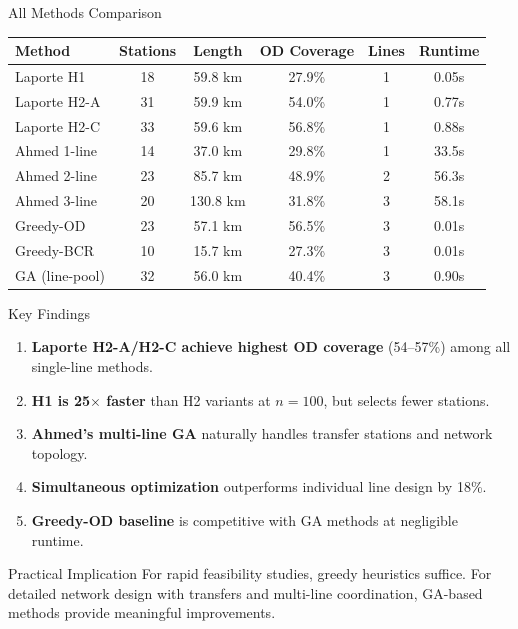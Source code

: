 \documentclass[aspectratio=169, 11pt]{beamer}
\begin{document}
\begin{frame}{All Methods Comparison}

\centering
\small
\begin{tabular}{lccccc}
\toprule
\textbf{Method} & \textbf{Stations} & \textbf{Length} & \textbf{OD Coverage} & \textbf{Lines} & \textbf{Runtime} \\
\midrule
Laporte H1    & 18 & 59.8 km & 27.9\% & 1 & 0.05s \\
Laporte H2-A  & 31 & 59.9 km & 54.0\% & 1 & 0.77s \\
Laporte H2-C  & 33 & 59.6 km & 56.8\% & 1 & 0.88s \\
\midrule
Ahmed 1-line  & 14 & 37.0 km & 29.8\% & 1 & 33.5s \\
Ahmed 2-line  & 23 & 85.7 km & 48.9\% & 2 & 56.3s \\
Ahmed 3-line  & 20 & 130.8 km & 31.8\% & 3 & 58.1s \\
\midrule
Greedy-OD     & 23 & 57.1 km & 56.5\% & 3 & 0.01s \\
Greedy-BCR    & 10 & 15.7 km & 27.3\% & 3 & 0.01s \\
GA (line-pool) & 32 & 56.0 km & 40.4\% & 3 & 0.90s \\
\bottomrule
\end{tabular}
\end{frame}

\begin{frame}{Key Findings}

\begin{enumerate}
    \item \textbf{Laporte H2-A/H2-C achieve highest OD coverage} (54--57\%) among all single-line methods.
    \item \textbf{H1 is 25\(\times\) faster} than H2 variants at \(n=100\), but selects fewer stations.
    \item \textbf{Ahmed's multi-line GA} naturally handles transfer stations and network topology.
    \item \textbf{Simultaneous optimization} outperforms individual line design by 18\%.
    \item \textbf{Greedy-OD baseline} is competitive with GA methods at negligible runtime.
\end{enumerate}

\vspace{0.3cm}
\begin{block}{Practical Implication}
For rapid feasibility studies, greedy heuristics suffice. For detailed network design with transfers and multi-line coordination, GA-based methods provide meaningful improvements.
\end{block}
\end{frame}
\end{document}
